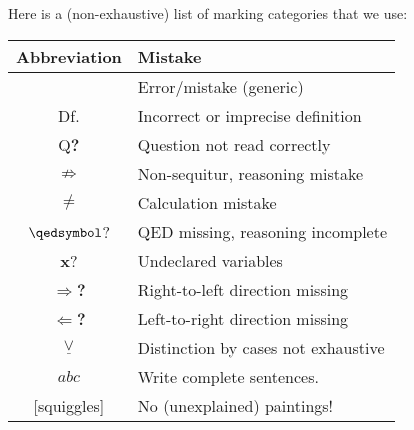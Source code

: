       Here is a (non-exhaustive) list of marking categories that we
      use:
      \begin{longtable}{c | l}
		Abbreviation & Mistake \\
		\hline
		\lightning & Error/mistake (generic)\\
		Df. & Incorrect or imprecise definition \\
		Q\textbf{?} & Question not read correctly\\
		$\not\Rightarrow$ & Non-sequitur, reasoning mistake\\
		$\neq$ & Calculation mistake \\
		$\qedsymbol$? & QED missing, reasoning incomplete\\
		\textbf{x}? & Undeclared variables\\
		$\Rightarrow$\textbf{?} & Right-to-left direction missing \\
		$\Leftarrow$\textbf{?} & Left-to-right direction missing \\
		$\underline{\lor}$ & Distinction by cases not exhaustive\\
		$abc$ & Write complete sentences.\\
		{[squiggles]} & No (unexplained)  paintings!
		\end{longtable}

